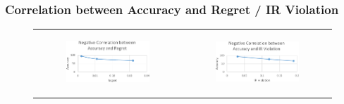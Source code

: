 \documentclass{beamer}
\begin{document}
\begin{frame}
	\frametitle{Correlation between Accuracy and Regret / IR Violation}	
	\begin{figure}[!ht]
		\begin{tabular}{c c}
			\begin{subfigure}{0.5\textwidth}
				
				\begin{center}
					\includegraphics[width=55mm]{res/negCorrelationRegret-cropped.pdf}
				\end{center}
				
			\end{subfigure} &
			\begin{subfigure}{0.5\textwidth}
				\includegraphics[width=55mm]{res/negCorrelationIR-cropped.pdf}
			\end{subfigure}
		\end{tabular}
	\end{figure}
\end{frame}
\end{document}

